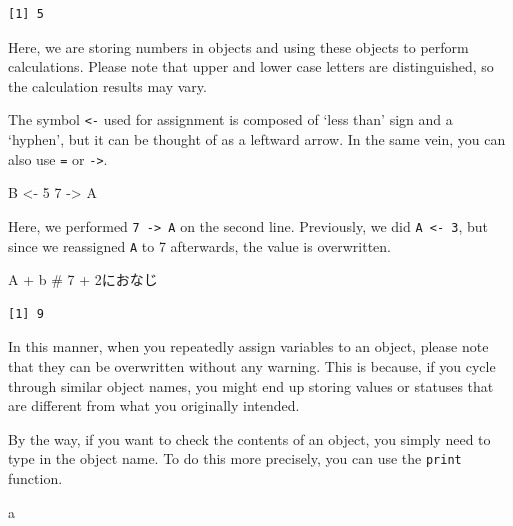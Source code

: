 \documentclass[
  a4paper,
]{book}
\newenvironment{Shaded}{\begin{snugshade}}{\end{snugshade}}
\newcommand{\CommentTok}[1]{\textcolor[rgb]{0.37,0.37,0.37}{#1}}
\newcommand{\DecValTok}[1]{\textcolor[rgb]{0.68,0.00,0.00}{#1}}
\newcommand{\NormalTok}[1]{\textcolor[rgb]{0.00,0.23,0.31}{#1}}
\newcommand{\OtherTok}[1]{\textcolor[rgb]{0.00,0.23,0.31}{#1}}
\newcommand{\SpecialCharTok}[1]{\textcolor[rgb]{0.37,0.37,0.37}{#1}}
\begin{document}
\begin{verbatim}
[1] 5
\end{verbatim}

Here, we are storing numbers in objects and using these objects to
perform calculations. Please note that upper and lower case letters are
distinguished, so the calculation results may vary.

The symbol \texttt{\textless{}-} used for assignment is composed of
`less than' sign and a `hyphen', but it can be thought of as a leftward
arrow. In the same vein, you can also use \texttt{=} or
\texttt{-\textgreater{}}.

\begin{Shaded}
\begin{Highlighting}[]
\NormalTok{B }\OtherTok{\textless{}{-}} \DecValTok{5}
\DecValTok{7} \OtherTok{{-}\textgreater{}}\NormalTok{ A}
\end{Highlighting}
\end{Shaded}

Here, we performed \texttt{7\ -\textgreater{}\ A} on the second line.
Previously, we did \texttt{A\ \textless{}-\ 3}, but since we reassigned
\texttt{A} to 7 afterwards, the value is overwritten.

\begin{Shaded}
\begin{Highlighting}[]
\NormalTok{A }\SpecialCharTok{+}\NormalTok{ b }\CommentTok{\# 7 + 2におなじ}
\end{Highlighting}
\end{Shaded}

\begin{verbatim}
[1] 9
\end{verbatim}

In this manner, when you repeatedly assign variables to an object,
please note that they can be overwritten without any warning. This is
because, if you cycle through similar object names, you might end up
storing values or statuses that are different from what you originally
intended.

By the way, if you want to check the contents of an object, you simply
need to type in the object name. To do this more precisely, you can use
the \texttt{print} function.

\begin{Shaded}
\begin{Highlighting}[]
\NormalTok{a}
\end{Highlighting}
\end{Shaded}
\end{document}
